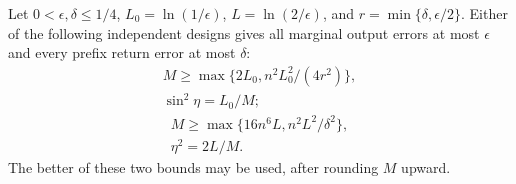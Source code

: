 \begin{theorem}\label{thm:manyupper}
Let $0<\epsilon,\delta\le1/4$, $L_0=\ln(1/\epsilon)$, $L=\ln(2/\epsilon)$, and $r=\min\{\delta,\epsilon/2\}$. Either of the following independent designs gives all marginal output errors at most $\epsilon$ and every prefix return error at most $\delta$:
\begin{equation}
 \begin{gathered}
 M\ge\max\{2L_0,n^2L_0^2/(4r^2)\},\\
 \sin^2\eta=L_0/M;
 \end{gathered}\label{eq:designold}
\end{equation}
\begin{equation}
 \begin{gathered}
 M\ge\max\{16n^6L,n^2L^2/\delta^2\},\\
 \eta^2=2L/M.
 \end{gathered}\label{eq:designnew}
\end{equation}
The better of these two bounds may be used, after rounding $M$ upward.
\end{theorem}
